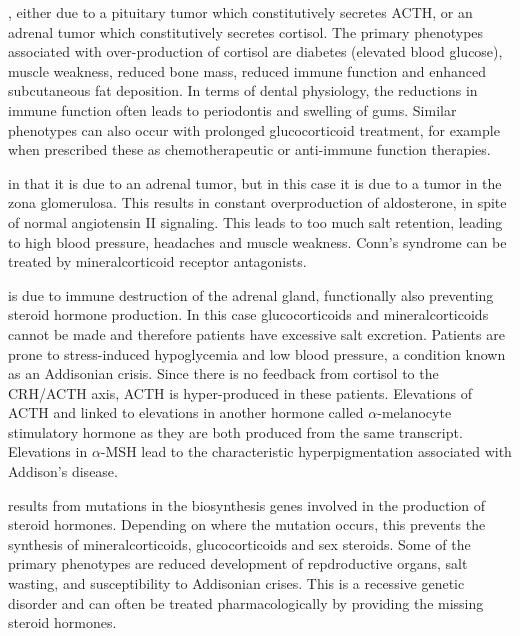 \documentclass{tufte-handout}
\begin{document}
, either due to a pituitary tumor which constitutively secretes ACTH, or an adrenal tumor which constitutively secretes cortisol.  The primary phenotypes associated with over-production of cortisol are diabetes (elevated blood glucose), muscle weakness, reduced bone mass, reduced immune function and enhanced subcutaneous fat deposition.  In terms of dental physiology, the reductions in immune function often leads to periodontis and swelling of gums. Similar phenotypes can also occur with prolonged glucocorticoid treatment, for example when prescribed these as chemotherapeutic or anti-immune function therapies.

 in that it is due to an adrenal tumor, but in this case it is due to a tumor in the zona glomerulosa.  This results in constant overproduction of aldosterone, in spite of normal angiotensin II signaling.  This leads to too much salt retention, leading to high blood pressure, headaches and muscle weakness.  Conn's syndrome can be treated by mineralcorticoid receptor antagonists.

 is due to immune destruction of the adrenal gland, functionally also preventing steroid hormone production.  In this case glucocorticoids and mineralcorticoids cannot be made and therefore patients have excessive salt excretion.  Patients are prone to stress-induced hypoglycemia and low blood pressure, a condition known as an Addisonian crisis.  Since there is no feedback from cortisol to the CRH/ACTH axis, ACTH is hyper-produced in these patients.  Elevations of ACTH and linked to elevations in another hormone called $\alpha$-melanocyte stimulatory hormone as they are both produced from the same transcript.  Elevations in $\alpha$-MSH lead to the characteristic hyperpigmentation associated with Addison's disease. 

 results from mutations in the biosynthesis genes involved in the production of steroid hormones.  Depending on where the mutation occurs, this prevents the synthesis of mineralcorticoids, glucocorticoids and sex steroids.  Some of the primary phenotypes are reduced development of repdroductive organs, salt wasting, and susceptibility to Addisonian crises.  This is a recessive genetic disorder and can often be treated pharmacologically by providing the missing steroid hormones.
\end{document}

